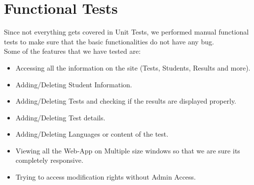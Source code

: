 \documentclass{mnnit}
\begin{document}
\section{Functional Tests}
Since not everything gets covered in Unit Tests, we performed manual functional tests to make sure that the basic functionalities do not have any bug.\\
Some of the features that we have tested are:
\begin{itemize}
    \item Accessing all the information on the site (Tests, Students, Results and more).
    \item Adding/Deleting Student Information.
    \item Adding/Deleting Tests and checking if the results are displayed properly.
    \item Adding/Deleting Test details.
    \item Adding/Deleting Languages or content of the test.
    \item Viewing all the Web-App on Multiple size windows so that we are sure its completely responsive.
    \item Trying to access modification rights without Admin Access.
\end{itemize}
\end{document}
